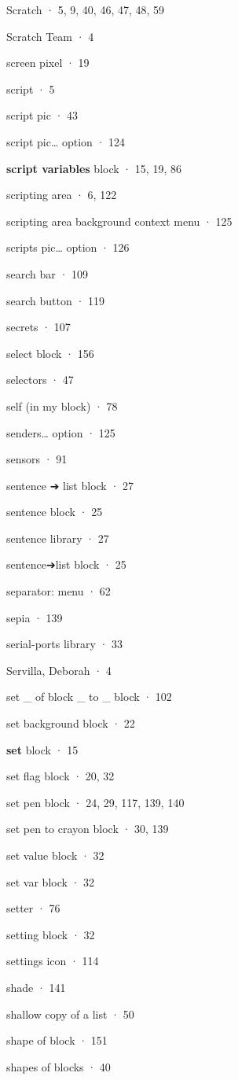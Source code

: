 Scratch · 5, 9, 40, 46, 47, 48, 59

Scratch Team · 4

screen pixel · 19

script · 5

script pic · 43

script pic\ldots{} option · 124

\textbf{script variables} block · 15, 19, 86

scripting area · 6, 122

scripting area background context menu · 125

scripts pic\ldots{} option · 126

search bar · 109

search button · 119

secrets · 107

select block · 156

selectors · 47

self (in my block) · 78

senders\ldots{} option · 125

sensors · 91

sentence ➔ list block · 27

sentence block · 25

sentence library · 27

sentence➔list block · 25

separator: menu · 62

sepia · 139

serial-ports library · 33

Servilla, Deborah · 4

set \_ of block \_ to \_ block · 102

set background block · 22

\textbf{set} block · 15

set flag block · 20, 32

set pen block · 24, 29, 117, 139, 140

set pen to crayon block · 30, 139

set value block · 32

set var block · 32

setter · 76

setting block · 32

settings icon · 114

shade · 141

shallow copy of a list · 50

shape of block · 151

shapes of blocks · 40

